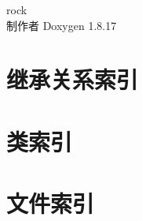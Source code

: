 \let\mypdfximage\pdfximage\def\pdfximage{\immediate\mypdfximage}\documentclass[twoside]{book}
\newcommand{\+}{\discretionary{\mbox{\scriptsize$\hookleftarrow$}}{}{}}
\newcommand{\clearemptydoublepage}{%
  \newpage{\pagestyle{empty}\cleardoublepage}%
}
\begin{document}
\begin{CJK}{UTF8}{min}

\begin{titlepage}
\vspace*{7cm}
\begin{center}%
{\Large rock }\\
\vspace*{1cm}
{\large 制作者 Doxygen 1.8.17}\\
\end{center}
\end{titlepage}
\clearemptydoublepage
{}
\tableofcontents
\clearemptydoublepage
{}

\chapter{继承关系索引}

\chapter{类索引}

\chapter{文件索引}


\end{CJK}
\end{document}
